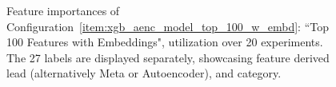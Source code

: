 \documentclass[\main/thesis.tex]{subfiles}
\begin{document}
\begin{appendices}
\begin{figure}[t]
    \centering
    \caption{Feature importances of Configuration~\ref{item:xgb_aenc_model_top_100_w_embd}: ``Top 100 Features with Embeddings", utilization over 20 experiments. The 27 labels are displayed separately, showcasing feature derived lead (alternatively Meta or Autoencoder), and category.}
    \label{fig:xgb_aenc_top_100_features_labelwise}
\end{figure}

\end{appendices}
\end{document}
